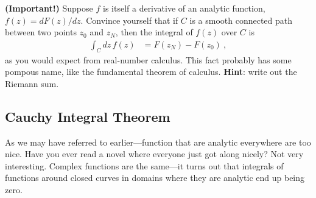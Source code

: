 \begin{exercise}\label{eq:fundamental:theorem:calculus} \textbf{(Important!)}
Suppose $f$ is itself a derivative of an analytic function, $f(z)=dF(z)/dz$.
Convince yourself that if $C$ is a smooth connected path between two points $z_0$ and $z_N$, then the integral of $f(z)$ over $C$ is
\begin{align}
	\int_C dz\, f(z) &= F(z_N) - F(z_0) \ ,
\end{align}
as you would expect from real-number calculus. This fact probably has some pompous name, like the fundamental theorem of calculus. \textbf{Hint}: write out the Riemann sum.
\end{exercise}


 

\subsection{Cauchy Integral Theorem}

As we may have referred to earlier---function that are analytic everywhere are too nice. Have you ever read a novel where everyone just got along nicely? Not very interesting. Complex functions are the same---it turns out that integrals of functions around closed curves in domains where they are analytic end up being zero. 


